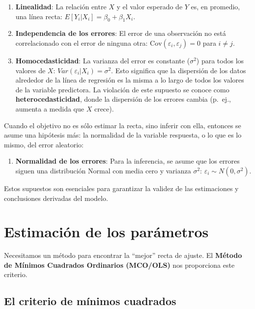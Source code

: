 \documentclass[
  letterpaper,
  DIV=11,
  numbers=noendperiod]{scrreprt}
\providecommand{\tightlist}{%
  \setlength{\itemsep}{0pt}\setlength{\parskip}{0pt}}
\begin{document}
\begin{enumerate}
\def\labelenumi{\arabic{enumi}.}
\tightlist
\item
  \textbf{Linealidad}: La relación entre \(X\) y el valor esperado de
  \(Y\) es, en promedio, una línea recta:
  \(E[Y_i | X_i] = \beta_0 + \beta_1 X_i\).
\item
  \textbf{Independencia de los errores}: El error de una observación no
  está correlacionado con el error de ninguna otra:
  \(\text{Cov}(\varepsilon_i, \varepsilon_j) = 0\) para \(i \neq j\).
\item
  \textbf{Homocedasticidad}: La varianza del error es constante
  (\(\sigma^2\)) para todos los valores de \(X\):
  \(Var(\varepsilon_i | X_i) = \sigma^2\). Esto significa que la
  dispersión de los datos alrededor de la línea de regresión es la misma
  a lo largo de todos los valores de la variable predictora. La
  violación de este supuesto se conoce como \textbf{heterocedasticidad},
  donde la dispersión de los errores cambia (p.~ej., aumenta a medida
  que \(X\) crece).
\end{enumerate}

Cuando el objetivo no es sólo estimar la recta, sino inferir con ella,
entonces se asume una hipótesis más: la normalidad de la variable
respuesta, o lo que es lo mismo, del error aleatorio:

\begin{enumerate}
\def\labelenumi{\arabic{enumi}.}
\setcounter{enumi}{3}
\tightlist
\item
  \textbf{Normalidad de los errores}: Para la inferencia, se asume que
  los errores siguen una distribución Normal con media cero y varianza
  \(\sigma^2\): \(\varepsilon_i \sim N(0, \sigma^2)\).
\end{enumerate}

Estos supuestos son esenciales para garantizar la validez de las
estimaciones y conclusiones derivadas del modelo.

\section{Estimación de los
parámetros}\label{estimaciuxf3n-de-los-paruxe1metros}

Necesitamos un método para encontrar la ``mejor'' recta de ajuste. El
\textbf{Método de Mínimos Cuadrados Ordinarios (MCO/OLS)} nos
proporciona este criterio.

\subsection{El criterio de mínimos
cuadrados}\label{el-criterio-de-muxednimos-cuadrados}
\end{document}
